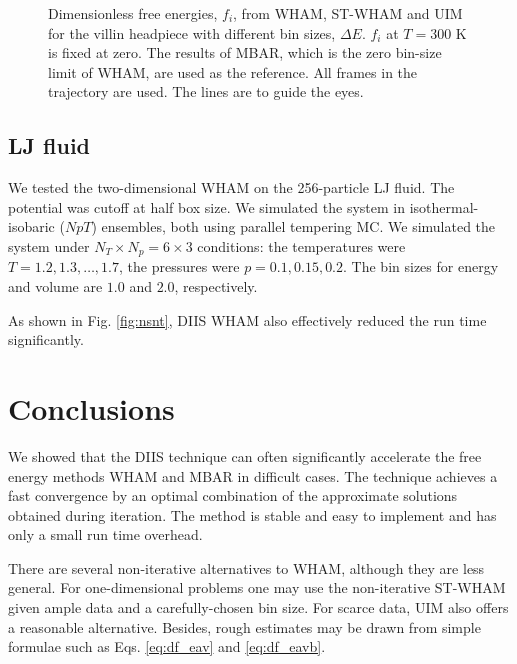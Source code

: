 \documentclass[reprint,aip,jcp,superscriptaddress]{revtex4-1}
\begin{document}
\begin{figure}[h]
  \caption{
    \label{fig:whamcmp}
    Dimensionless free energies, $f_i$,
    from WHAM, ST-WHAM and UIM
    for the villin headpiece
    with different bin sizes, $\Delta E$.
    $f_i$ at $T = 300$ K is fixed at zero.
    The results of MBAR, which is
    the zero bin-size limit of WHAM,
    are used as the reference.
    All frames in the trajectory are used.
    The lines are to guide the eyes.
  }
\end{figure}




\subsection{\label{sec:results_LJ}
LJ fluid}


We tested the two-dimensional WHAM
on the 256-particle LJ fluid.
%
The potential was cutoff at half box size.
%
We simulated the system in isothermal-isobaric ($NpT$) ensembles,
both using parallel tempering MC.
%
We simulated the system
under $N_T \times N_p = 6\times 3$ conditions:
the temperatures were $T = 1.2, 1.3, \dots, 1.7$,
the pressures were $p = 0.1, 0.15, 0.2$.
%
The bin sizes for energy and volume
are $1.0$ and $2.0$, respectively.


As shown in Fig. \ref{fig:nsnt},
DIIS WHAM also effectively
reduced the run time significantly.





\section{Conclusions}



We showed that the DIIS technique
can often significantly accelerate
the free energy methods WHAM and MBAR
in difficult cases.
%
The technique achieves a fast convergence
by an optimal combination of the approximate
solutions obtained during iteration.
%
The method is stable and easy to implement
and has only a small run time overhead.



There are several
non-iterative alternatives to WHAM,
although they are less general.
%
For one-dimensional problems
one may use
the non-iterative ST-WHAM
given ample data
and a carefully-chosen bin size.
%
For scarce data,
UIM also offers a reasonable alternative.
%
Besides,
rough estimates
may be drawn from simple formulae
such as
Eqs. \eqref{eq:df_eav} and \eqref{eq:df_eavb}.
\end{document}
